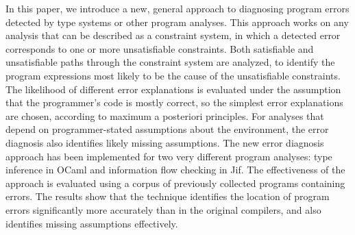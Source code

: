 In this paper, we introduce a new, general approach to diagnosing
program errors detected by type systems or other program analyses.
This approach works on any analysis that can be described as a
constraint system, in which a detected error corresponds to one or
more unsatisfiable constraints.  Both satisfiable and unsatisfiable
paths through the constraint system are analyzed, to identify the
program expressions most likely to be the cause of the unsatisfiable
constraints. The likelihood of different error explanations is
evaluated under the assumption that the programmer's code is mostly
correct, so the simplest error explanations are chosen, according to
maximum a posteriori principles. For analyses that depend on
programmer-stated assumptions about the environment, the error
diagnosis also identifies likely missing assumptions.  The new error
diagnosis approach has been implemented for two very different program
analyses: type inference in OCaml and information flow checking in
Jif. The effectiveness of the approach is evaluated using a corpus of
previously collected programs containing errors. The results show that
the technique identifies the location of program errors significantly
more accurately than in the original compilers, and also identifies
missing assumptions effectively.
